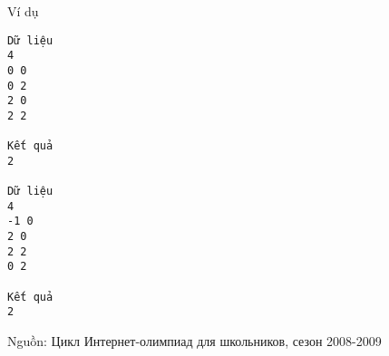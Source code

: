 Ví dụ
\begin{verbatim}
Dữ liệu
4
0 0
0 2
2 0
2 2

Kết quả
2

Dữ liệu
4
-1 0
2 0
2 2
0 2

Kết quả
2
\end{verbatim}

   Nguồn: Цикл Интернет-олимпиад для школьников, сезон 2008-2009